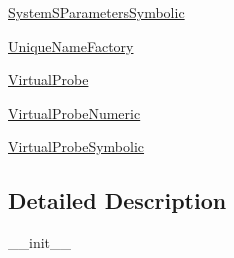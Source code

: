 \begin{DoxyCompactItemize}
\item 
 \hyperlink{namespaceSignalIntegrity_1_1SystemDescriptions_1_1SystemSParametersSymbolic}{System\+S\+Parameters\+Symbolic}
\item 
 \hyperlink{namespaceSignalIntegrity_1_1SystemDescriptions_1_1UniqueNameFactory}{Unique\+Name\+Factory}
\item 
 \hyperlink{namespaceSignalIntegrity_1_1SystemDescriptions_1_1VirtualProbe}{Virtual\+Probe}
\item 
 \hyperlink{namespaceSignalIntegrity_1_1SystemDescriptions_1_1VirtualProbeNumeric}{Virtual\+Probe\+Numeric}
\item 
 \hyperlink{namespaceSignalIntegrity_1_1SystemDescriptions_1_1VirtualProbeSymbolic}{Virtual\+Probe\+Symbolic}
\end{DoxyCompactItemize}


\subsection{Detailed Description}
\begin{DoxyVerb}__init__\end{DoxyVerb}
 